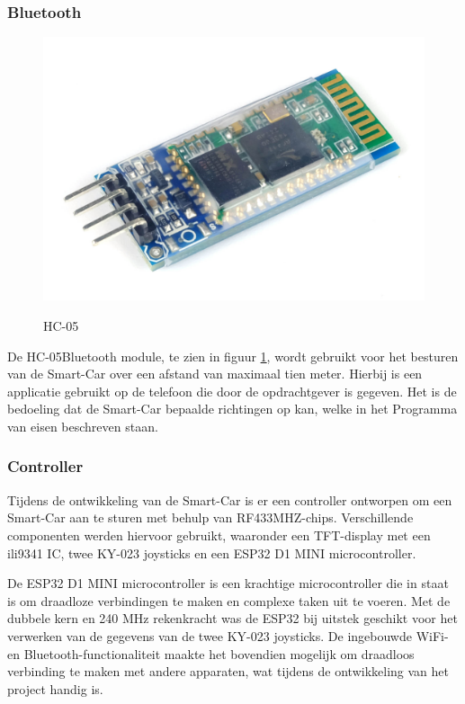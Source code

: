 \subsubsection{Bluetooth}\begin{figure}[h]
    \centering
    \includegraphics[scale = 0.08]{Media/Figuren/HC-05_hardware.jpg}
    \caption{HC-05}
    \label{HC-05}
    \cite{HC-05-image-fysiek-RL} 
\end{figure}

De HC-05\gls{Bluetooth} module, te zien in figuur \ref{HC-05}\cite{HC-05-image-fysiek-RL}, wordt gebruikt voor het besturen van de \gls{Smart-Car} over een afstand van maximaal tien meter. Hierbij is een applicatie gebruikt op de telefoon die door de opdrachtgever is gegeven. Het is de bedoeling dat de \gls{Smart-Car} bepaalde richtingen op kan, welke in het Programma van eisen beschreven staan. 
\subsubsection{Controller}
Tijdens de ontwikkeling van de \gls{Smart-Car} is er een controller ontworpen om een \gls{Smart-Car} aan te sturen met behulp van \gls{RF433MHZ}-chips. Verschillende componenten werden hiervoor gebruikt, waaronder een \gls{TFT-display} met een \gls{ili9341}\cite{ILI3941} IC, twee KY-023 joysticks en een ESP32\cite{ESP32} D1 MINI \gls{microcontroller}.

De ESP32\cite{ESP32} D1 MINI \gls{microcontroller} is een krachtige \gls{microcontroller} die in staat is om draadloze verbindingen te maken en complexe taken uit te voeren. Met de dubbele kern en 240 MHz rekenkracht was de ESP32\cite{ESP32} bij uitstek geschikt voor het verwerken van de gegevens van de twee KY-023 joysticks. De ingebouwde WiFi- en \gls{Bluetooth}-functionaliteit maakte het bovendien mogelijk om draadloos verbinding te maken met andere apparaten, wat tijdens de ontwikkeling van het project handig is.

